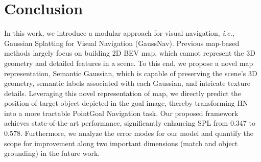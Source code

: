 
\section{Conclusion}

In this work, we introduce a modular approach for visual navigation, \emph{i.e.,} Gaussian Splatting for Visual Navigation (GaussNav). 
Previous map-based methods largely focus on building 2D BEV map, which cannot represent the 3D geometry and detailed features in a scene. 
To this end, we propose a novel map representation, Semantic Gaussian, which is capable of preserving the scene's 3D geometry, semantic labels associated with each Gaussian, and intricate texture details. 
Leveraging this novel representation of map, we directly predict the position of target object depicted in the goal image, thereby transforming IIN into a more tractable PointGoal Navigation task. 
Our proposed framework achieves state-of-the-art performance, significantly enhancing SPL from 0.347 to 0.578. 
Furthermore, we analyze the error modes for our model and quantify the scope for improvement along two important dimensions (match and object grounding) in the future work.
